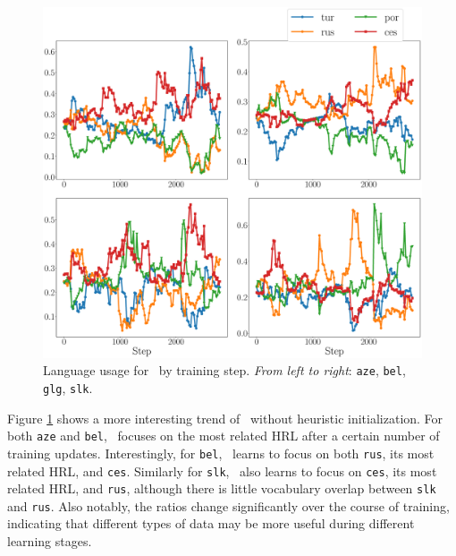 \begin{figure}
    \centering
    \includegraphics[width=0.8\columnwidth]{figs/uniform_prob_plot.eps}
    \caption{\label{fig:nmt_distrib_uni}Language usage for \dds~by training step. \textit{From left to right}: \texttt{aze}, \texttt{bel}, \texttt{glg}, \texttt{slk}.}
\end{figure}

Figure \ref{fig:nmt_distrib_uni} shows a more interesting trend of \dds~without heuristic initialization.
For both \texttt{aze} and \texttt{bel}, \dds~focuses on the most related HRL after a certain number of training updates.
Interestingly, for \texttt{bel}, \dds~learns to focus on both \texttt{rus}, its most related HRL, and \texttt{ces}. Similarly for \texttt{slk}, \dds~also learns to focus on \texttt{ces}, its most related HRL, and \texttt{rus}, although there is little vocabulary overlap between \texttt{slk} and \texttt{rus}.
Also notably, the ratios change  significantly over the course of training, indicating that different types of data may be more useful during different learning stages.
